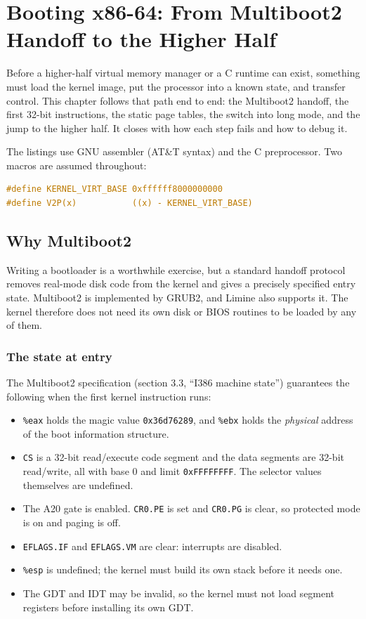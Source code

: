 \chapter{Booting x86-64: From Multiboot2 Handoff to the Higher Half}

\label{ch:boot}

Before a higher-half virtual memory manager or a C runtime can exist, something must load the kernel image, put the processor into a known state, and transfer control. This chapter follows that path end to end: the Multiboot2 handoff, the first 32-bit instructions, the static page tables, the switch into long mode, and the jump to the higher half. It closes with how each step fails and how to debug it.

The listings use GNU assembler (AT\&T syntax) and the C preprocessor. Two macros are assumed throughout:

\begin{lstlisting}[language=C]
#define KERNEL_VIRT_BASE 0xffffff8000000000
#define V2P(x)           ((x) - KERNEL_VIRT_BASE)
\end{lstlisting}

\section{Why Multiboot2}

Writing a bootloader is a worthwhile exercise, but a standard handoff protocol removes real-mode disk code from the kernel and gives a precisely specified entry state. Multiboot2 is implemented by GRUB2, and Limine also supports it. The kernel therefore does not need its own disk or BIOS routines to be loaded by any of them.

\subsection{The state at entry}

The Multiboot2 specification (section 3.3, ``I386 machine state'') guarantees the following when the first kernel instruction runs:

\begin{itemize}
\tightlist
\item
  \texttt{\%eax} holds the magic value \texttt{0x36d76289}, and \texttt{\%ebx} holds the \emph{physical} address of the boot information structure.
\item
  \texttt{CS} is a 32-bit read/execute code segment and the data segments are 32-bit read/write, all with base 0 and limit \texttt{0xFFFFFFFF}. The selector values themselves are undefined.
\item
  The A20 gate is enabled. \texttt{CR0.PE} is set and \texttt{CR0.PG} is clear, so protected mode is on and paging is off.
\item
  \texttt{EFLAGS.IF} and \texttt{EFLAGS.VM} are clear: interrupts are disabled.
\item
  \texttt{\%esp} is undefined; the kernel must build its own stack before it needs one.
\item
  The GDT and IDT may be invalid, so the kernel must not load segment registers before installing its own GDT.
\end{itemize}

